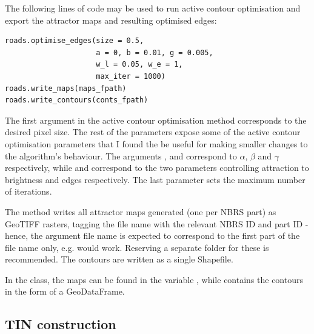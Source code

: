 The following lines of code may be used to run active contour optimisation and export the attractor maps and resulting optimised edges:

\begin{lstlisting}
roads.optimise_edges(size = 0.5,
                     a = 0, b = 0.01, g = 0.005,
                     w_l = 0.05, w_e = 1,
                     max_iter = 1000)
roads.write_maps(maps_fpath)
roads.write_contours(conts_fpath)
\end{lstlisting}

The first argument  in the active contour optimisation method corresponds to the desired pixel size. The rest of the parameters expose some of the active contour optimisation parameters that I found the be useful for making smaller changes to the algorithm's behaviour. The arguments ,  and  correspond to $\alpha$, $\beta$ and $\gamma$ respectively, while  and  correspond to the two parameters controlling attraction to brightness and edges respectively. The last parameter sets the maximum number of iterations.

The  method writes all attractor maps generated (one per NBRS part) as GeoTIFF rasters, tagging the file name with the relevant NBRS ID and part ID - hence, the argument file name is expected to correspond to the first part of the file name only, e.g.  would work. Reserving a separate folder for these is recommended. The contours are written as a single Shapefile.

In the class, the maps can be found in the variable , while  contains the contours in the form of a GeoDataFrame.

\subsection{TIN construction}
\label{sub:r_tinconstruction}

